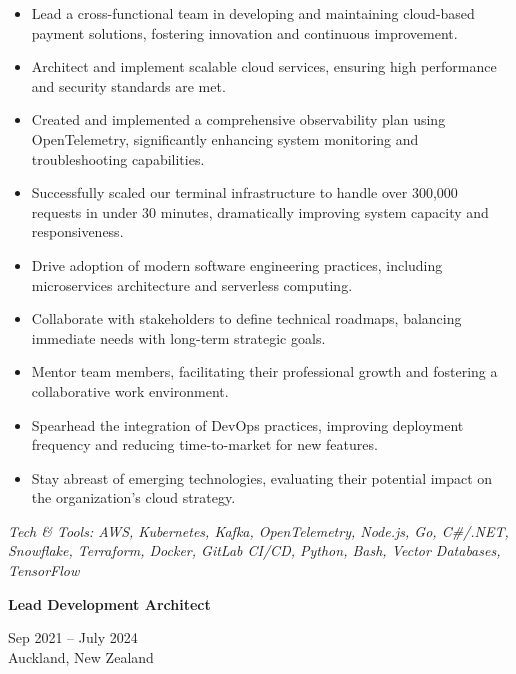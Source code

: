 \documentclass[10pt,a4paper,ragged2e,withhyper]{altacv}
\renewcommand{\cvevent}[4]{%
  \textbf{#1} %
  \hfill %
  \begin{minipage}[t]{.5\linewidth}
    \raggedleft %
    \small#3 %
    \\ %
    #4 %
  \end{minipage}
  \vspace{\baselineskip} %
}
\begin{document}
\begin{itemize}
\item Lead a cross-functional team in developing and maintaining cloud-based payment solutions, fostering innovation and continuous improvement.
\item Architect and implement scalable cloud services, ensuring high performance and security standards are met.
\item Created and implemented a comprehensive observability plan using OpenTelemetry, significantly enhancing system monitoring and troubleshooting capabilities.
\item Successfully scaled our terminal infrastructure to handle over 300,000 requests in under 30 minutes, dramatically improving system capacity and responsiveness.
\item Drive adoption of modern software engineering practices, including microservices architecture and serverless computing.
\item Collaborate with stakeholders to define technical roadmaps, balancing immediate needs with long-term strategic goals.
\item Mentor team members, facilitating their professional growth and fostering a collaborative work environment.
\item Spearhead the integration of DevOps practices, improving deployment frequency and reducing time-to-market for new features.
\item Stay abreast of emerging technologies, evaluating their potential impact on the organization's cloud strategy.
\end{itemize}

\vspace{0.5cm}

\textit{Tech \& Tools: AWS, Kubernetes, Kafka, OpenTelemetry, Node.js, Go, C\#/.NET, Snowflake, Terraform, Docker, GitLab CI/CD, Python, Bash, Vector Databases, TensorFlow}

\divider


\cvevent{Lead Development Architect}{Idexx Laboratories}{Sep 2021 -- July 2024}{Auckland, New Zealand}
\end{document}
